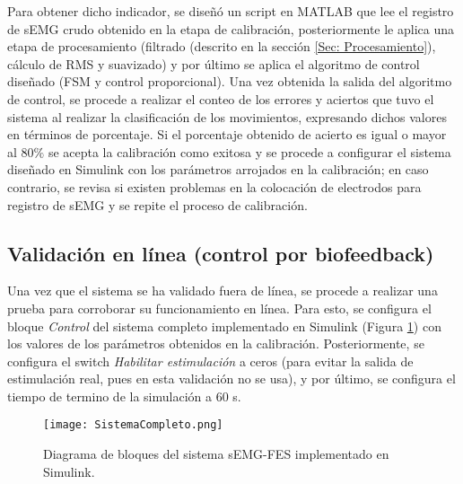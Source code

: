 Para obtener dicho indicador, se diseñó un script en MATLAB\textregistered \; que lee el registro de sEMG crudo obtenido en la etapa de calibración, posteriormente le aplica una etapa de procesamiento (filtrado (descrito en la sección \ref{Sec: Procesamiento}), cálculo de RMS y suavizado) y por último se aplica el algoritmo de control diseñado (FSM y control proporcional). Una vez obtenida la salida del algoritmo de control, se procede a realizar el conteo de los errores y aciertos que tuvo el sistema al realizar la clasificación de los movimientos, expresando dichos valores en términos de porcentaje. Si el porcentaje obtenido de acierto es igual o mayor al 80$\%$ se acepta la calibración como exitosa y se procede a configurar el sistema diseñado en Simulink\textregistered \; con los parámetros arrojados en la calibración; en caso contrario, se revisa si existen problemas en la colocación de electrodos para registro de sEMG y se repite el proceso de calibración.

\subsection{Validación en línea (control por biofeedback)}
Una vez que el sistema se ha validado fuera de línea, se procede a realizar una prueba para corroborar su funcionamiento en línea. Para esto, se configura el bloque \emph{Control} del sistema completo implementado en Simulink\textregistered \; (Figura \ref{Figura: SisComp}) con los valores de los parámetros obtenidos en la calibración. Posteriormente, se configura el switch \emph{Habilitar estimulación} a ceros (para evitar la salida de estimulación real, pues en esta validación no se usa), y por último, se configura el tiempo de termino de la simulación a 60 s.

\begin{figure}[htbp]
	\centering
	\texttt{[image: SistemaCompleto.png]}
	\caption{Diagrama de bloques del sistema sEMG-FES implementado en Simulink\textregistered.}
	\label{Figura: SisComp}
\end{figure}

